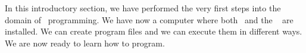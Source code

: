 %
%
In this introductory section, we have performed the very first steps into the domain of \python\ programming.
We have now a computer where both \python\ and the \pycharm\  are installed.
We can create program files and we can execute them in different ways.
We are now ready to learn how to program.%
%
\endhsection%
%
